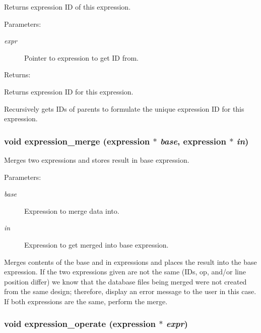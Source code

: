 Returns expression ID of this expression.

\begin{Desc}
\item[Parameters: ]\par
\begin{description}
\item[{\em 
expr}]Pointer to expression to get ID from. \end{description}
\end{Desc}
\begin{Desc}
\item[Returns: ]\par
Returns expression ID for this expression.\end{Desc}
Recursively gets IDs of parents to formulate the unique expression ID for this expression. 
\subsubsection{\setlength{\rightskip}{0pt plus 5cm}void expression\_\-merge ({\bf expression} $\ast$ {\em base}, {\bf expression} $\ast$ {\em in})}\label{expr_8h_a2}


Merges two expressions and stores result in base expression.

\begin{Desc}
\item[Parameters: ]\par
\begin{description}
\item[{\em 
base}]Expression to merge data into. \item[{\em 
in}]Expression to get merged into base expression.\end{description}
\end{Desc}
Merges contents of the base and in expressions and places the result into the base expression. If the two expressions given are not the same (IDs, op, and/or line position differ) we know that the database files being merged  were not created from the same design; therefore, display an error message  to the user in this case. If both expressions are the same, perform the  merge. 
\subsubsection{\setlength{\rightskip}{0pt plus 5cm}void expression\_\-operate ({\bf expression} $\ast$ {\em expr})}\label{expr_8h_a7}


